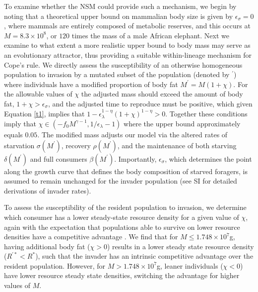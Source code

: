 \documentclass[twocolumn,preprintnumbers,amsmath,amssymb,superscriptaddress]{revtex4}
\begin{document}
\begin{bibunit}[unsrt]
To examine whether the NSM could provide such a mechanism, we begin by noting that a theoretical upper bound on mammalian body size is given by $\epsilon_\sigma=0$, where mammals are entirely composed of metabolic reserves, and this occurs at $M=8.3\times 10^8$, or $120$ times the mass of a male African elephant.
Next we examine to what extent a more realistic upper bound to body mass may serve as an evolutionary attractor, thus providing a suitable within-lineage mechanism for Cope's rule.
We directly assess the susceptibility of an otherwise homogeneous population to invasion by a mutated subset of the population (denoted by $^\prime$) where individuals have a modified proportion of body fat $M^\prime=M(1+\chi)$.
For the allowable values of $\chi$ the adjusted mass should exceed the amount of body fat, $1+\chi>\epsilon_{\sigma}$, and the adjusted time to reproduce must be positive, which given Equation \ref{t1}, implies that $1-\epsilon_{\lambda}^{1-\eta}\left(1+\chi\right)^{1-\eta}>0$.
Together these conditions imply that  $\chi\in(-f_0M^{\gamma-1},1/\epsilon_{\lambda}-1)$ where the upper bound approximately equals $0.05$.
The modified mass adjusts our model via the altered rates of starvation $\sigma(M^\prime)$, recovery $\rho(M^\prime)$, and the maintenance of both starving $\delta(M^\prime)$ and full consumers $\beta(M^\prime)$.
Importantly, $\epsilon_\sigma$, which determines the point along the growth curve that defines the body composition of starved foragers, is assumed to remain unchanged for the invader population (see SI for detailed derivations of invader rates).



To assess the susceptibility of the resident population to invasion, we determine which consumer has a lower steady-state resource density for a given value of $\chi$, again with the expectation that populations able to survive on lower resource densities have a competitive advantage \cite{tilman1981}.
We find that for $M\leq 1.748\times10^7$g, having additional body fat ($\chi > 0$) results in a lower steady state resource density ($R^{\prime *}<R^*$), such that the invader has an intrinsic competitive advantage over the resident population.
However, for $M> 1.748\times10^7$g, leaner individuals ($\chi < 0$) have lower resource steady state densities, switching the advantage for higher values of $M$.






\end{bibunit}
\end{document}
